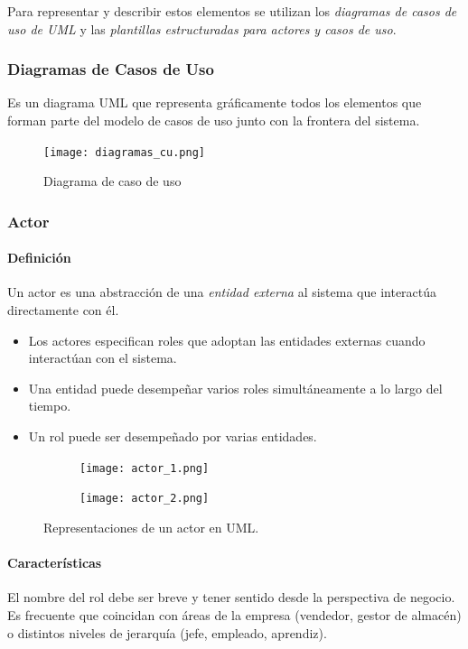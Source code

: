 \documentclass[12pt,spanish]{article}
\begin{document}
Para representar y describir estos elementos se utilizan los \emph{diagramas de casos de uso de UML} y las \emph{plantillas estructuradas para actores y casos de uso}.

\subsubsection{Diagramas de Casos de Uso}

Es un diagrama UML que representa gráficamente todos los elementos que forman parte del modelo de casos de uso junto con la frontera del sistema.
\begin{figure}[H]
\centering
\texttt{[image: diagramas\_cu.png]}
\caption{Diagrama de caso de uso}
\end{figure}

\subsubsection{Actor}

\paragraph{Definición}
Un actor es una abstracción de una \emph{entidad externa} al sistema que interactúa directamente con él.
\begin{itemize}
	\item Los actores especifican roles que adoptan las entidades externas cuando interactúan con el sistema.
	\item Una entidad puede desempeñar varios roles simultáneamente a lo largo del tiempo.
	\item Un rol puede ser desempeñado por varias entidades.
\end{itemize}

\begin{figure}[H]
	\centering
	\begin{subfigure}[b]{0.15\textwidth}
		\texttt{[image: actor\_1.png]}
		\caption{}
	\end{subfigure}
	\quad
	\begin{subfigure}[b]{0.25\textwidth}
		\texttt{[image: actor\_2.png]}
		\caption{}
	\end{subfigure}
	\caption{Representaciones de un actor en UML.}
\end{figure}

\paragraph{Características}
El nombre del rol debe ser breve y tener sentido desde la perspectiva de negocio. Es frecuente que coincidan con áreas de la empresa (vendedor, gestor de almacén) o distintos niveles de jerarquía (jefe, empleado, aprendiz).
\end{document}
